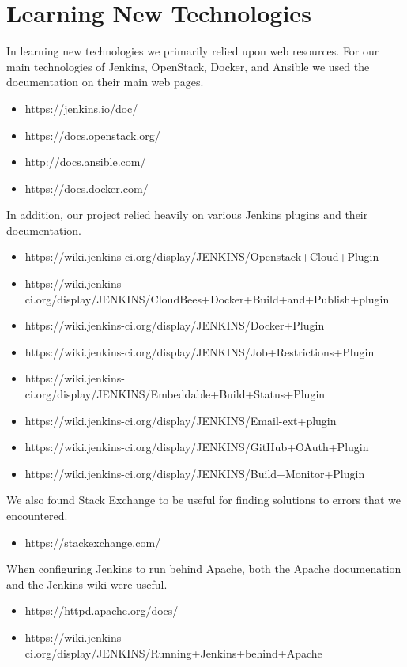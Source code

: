 \documentclass[10pt,letterpaper,onecolumn,draftclsnofoot]{IEEEtran}
\begin{document}
\section{Learning New Technologies}
In learning new technologies we primarily relied upon web resources. For our main technologies of Jenkins, OpenStack, Docker, and Ansible
we used the documentation on their main web pages.
\begin{itemize}
  \item https://jenkins.io/doc/
  \item https://docs.openstack.org/
  \item http://docs.ansible.com/
  \item https://docs.docker.com/
\end{itemize}

In addition, our project relied heavily on various Jenkins plugins and their documentation.
\begin{itemize}
  \item https://wiki.jenkins-ci.org/display/JENKINS/Openstack+Cloud+Plugin
  \item https://wiki.jenkins-ci.org/display/JENKINS/CloudBees+Docker+Build+and+Publish+plugin
  \item https://wiki.jenkins-ci.org/display/JENKINS/Docker+Plugin
  \item https://wiki.jenkins-ci.org/display/JENKINS/Job+Restrictions+Plugin
  \item https://wiki.jenkins-ci.org/display/JENKINS/Embeddable+Build+Status+Plugin
  \item https://wiki.jenkins-ci.org/display/JENKINS/Email-ext+plugin
  \item https://wiki.jenkins-ci.org/display/JENKINS/GitHub+OAuth+Plugin
  \item https://wiki.jenkins-ci.org/display/JENKINS/Build+Monitor+Plugin
\end{itemize}

We also found Stack Exchange to be useful for finding solutions to errors that we encountered.
\begin{itemize}
  \item https://stackexchange.com/
\end{itemize}

When configuring Jenkins to run behind Apache, both the Apache documenation and the Jenkins wiki were useful.
\begin{itemize}
  \item https://httpd.apache.org/docs/
  \item https://wiki.jenkins-ci.org/display/JENKINS/Running+Jenkins+behind+Apache
\end{itemize}
\end{document}
